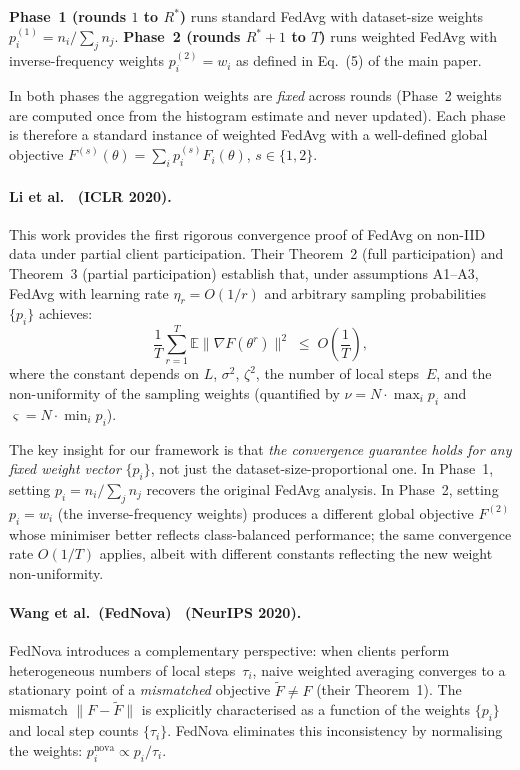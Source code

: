 \documentclass[runningheads]{llncs}
\begin{document}
\textbf{Phase~1 (rounds $1$ to $R^*$)} runs standard FedAvg with dataset-size weights $p_i^{(1)}=n_i/\sum_j n_j$.
\textbf{Phase~2 (rounds $R^*\!+\!1$ to $T$)} runs weighted FedAvg with inverse-frequency weights $p_i^{(2)}=w_i$ as defined in Eq.~(5) of the main paper.

In both phases the aggregation weights are \emph{fixed} across rounds (Phase~2 weights are computed once from the histogram estimate and never updated).
Each phase is therefore a standard instance of weighted FedAvg with a well-defined global objective $F^{(s)}(\theta)=\sum_i p_i^{(s)} F_i(\theta)$, $s\in\{1,2\}$.

\paragraph{Li et al.~\cite{ref_li_convergence} (ICLR 2020).}
This work provides the first rigorous convergence proof of FedAvg on non-IID data under partial client participation.
Their Theorem~2 (full participation) and Theorem~3 (partial participation) establish that, under assumptions A1--A3, FedAvg with learning rate $\eta_r=O(1/r)$ and arbitrary sampling probabilities $\{p_i\}$ achieves:
\[
\frac{1}{T}\sum_{r=1}^{T}\mathbb{E}\|\nabla F(\theta^r)\|^2
\;\le\;
O\!\left(\frac{1}{T}\right),
\]
where the constant depends on $L$, $\sigma^2$, $\zeta^2$, the number of local steps~$E$, and the non-uniformity of the sampling weights (quantified by $\nu=N\!\cdot\!\max_i p_i$ and $\varsigma=N\!\cdot\!\min_i p_i$).

The key insight for our framework is that \emph{the convergence guarantee holds for any fixed weight vector} $\{p_i\}$, not just the dataset-size-proportional one.
In Phase~1, setting $p_i=n_i/\sum_j n_j$ recovers the original FedAvg analysis.
In Phase~2, setting $p_i=w_i$ (the inverse-frequency weights) produces a different global objective $F^{(2)}$ whose minimiser better reflects class-balanced performance; the same convergence rate $O(1/T)$ applies, albeit with different constants reflecting the new weight non-uniformity.

\paragraph{Wang et al.~(FedNova)~\cite{ref_fednova} (NeurIPS 2020).}
FedNova introduces a complementary perspective: when clients perform heterogeneous numbers of local steps~$\tau_i$, naive weighted averaging converges to a stationary point of a \emph{mismatched} objective $\tilde{F}\neq F$ (their Theorem~1).
The mismatch $\|F-\tilde{F}\|$ is explicitly characterised as a function of the weights $\{p_i\}$ and local step counts $\{\tau_i\}$.
FedNova eliminates this inconsistency by normalising the weights: $p_i^{\text{nova}} \propto p_i/\tau_i$.
\end{document}
